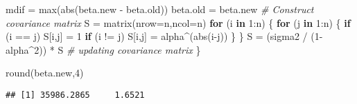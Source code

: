 \documentclass[
]{article}
\newenvironment{Shaded}{\begin{snugshade}}{\end{snugshade}}
\newcommand{\AttributeTok}[1]{\textcolor[rgb]{0.77,0.63,0.00}{#1}}
\newcommand{\CommentTok}[1]{\textcolor[rgb]{0.56,0.35,0.01}{\textit{#1}}}
\newcommand{\ControlFlowTok}[1]{\textcolor[rgb]{0.13,0.29,0.53}{\textbf{#1}}}
\newcommand{\DecValTok}[1]{\textcolor[rgb]{0.00,0.00,0.81}{#1}}
\newcommand{\FunctionTok}[1]{\textcolor[rgb]{0.00,0.00,0.00}{#1}}
\newcommand{\NormalTok}[1]{#1}
\newcommand{\OtherTok}[1]{\textcolor[rgb]{0.56,0.35,0.01}{#1}}
\newcommand{\SpecialCharTok}[1]{\textcolor[rgb]{0.00,0.00,0.00}{#1}}
\begin{document}
\begin{Shaded}
\begin{Highlighting}[]
\NormalTok{  mdif }\OtherTok{=} \FunctionTok{max}\NormalTok{(}\FunctionTok{abs}\NormalTok{(beta.new }\SpecialCharTok{{-}}\NormalTok{ beta.old))}
\NormalTok{  beta.old }\OtherTok{=}\NormalTok{ beta.new}
  \CommentTok{\# Construct covariance matrix}
\NormalTok{  S }\OtherTok{=} \FunctionTok{matrix}\NormalTok{(}\AttributeTok{nrow=}\NormalTok{n,}\AttributeTok{ncol=}\NormalTok{n)}
  \ControlFlowTok{for}\NormalTok{ (i }\ControlFlowTok{in} \DecValTok{1}\SpecialCharTok{:}\NormalTok{n)}
\NormalTok{  \{}
    \ControlFlowTok{for}\NormalTok{ (j }\ControlFlowTok{in} \DecValTok{1}\SpecialCharTok{:}\NormalTok{n)}
\NormalTok{    \{}
      \ControlFlowTok{if}\NormalTok{ (i }\SpecialCharTok{==}\NormalTok{ j) S[i,j] }\OtherTok{=} \DecValTok{1}
      \ControlFlowTok{if}\NormalTok{ (i }\SpecialCharTok{!=}\NormalTok{ j) S[i,j] }\OtherTok{=}\NormalTok{ alpha}\SpecialCharTok{\^{}}\NormalTok{(}\FunctionTok{abs}\NormalTok{(i}\SpecialCharTok{{-}}\NormalTok{j))}
\NormalTok{    \}}
\NormalTok{  \}}
\NormalTok{  S }\OtherTok{=}\NormalTok{ (sigma2 }\SpecialCharTok{/}\NormalTok{ (}\DecValTok{1}\SpecialCharTok{{-}}\NormalTok{alpha}\SpecialCharTok{\^{}}\DecValTok{2}\NormalTok{)) }\SpecialCharTok{*}\NormalTok{ S }\CommentTok{\# updating covariance matrix}
\NormalTok{\}}

\FunctionTok{round}\NormalTok{(beta.new,}\DecValTok{4}\NormalTok{)}
\end{Highlighting}
\end{Shaded}

\begin{verbatim}
## [1] 35986.2865     1.6521
\end{verbatim}
\end{document}
